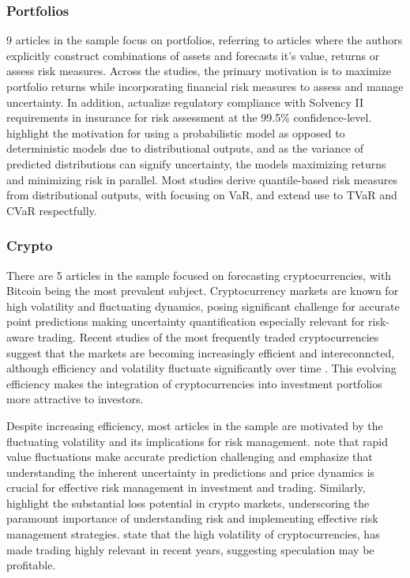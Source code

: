 \subsubsection{Portfolios}
9 articles in the sample focus on portfolios, referring to articles where the authors explicitly construct combinations of assets and forecasts it's value, returns or assess risk measures. Across the studies, the primary motivation is to maximize portfolio returns while incorporating financial risk measures to assess and manage uncertainty. In addition, \cite{Risk2018gpr} actualize regulatory compliance with Solvency II requirements in insurance for risk assessment at the 99.5\% confidence-level. \cite{kim2023portfolio} highlight the motivation for using a probabilistic model as opposed to deterministic models due to distributional outputs, and as the variance of predicted distributions can signify uncertainty, the models maximizing returns and minimizing risk in parallel. Most studies derive quantile-based risk measures from distributional outputs, with \cite{Fatouros2023DeepVaR, arian2022encoded, caprioli2023quantifying} focusing on VaR, and  \cite{Risk2018gpr, Min2023BlackLitterman} extend use to TVaR and CVaR respectfully. 

\subsubsection{Crypto}
There are 5 articles in the sample focused on forecasting cryptocurrencies, with Bitcoin being the most prevalent subject. Cryptocurrency markets are known for high volatility and fluctuating dynamics, posing significant challenge for accurate point predictions making uncertainty quantification especially relevant for risk-aware trading. Recent studies of the most frequently traded cryptocurrencies suggest that the markets are becoming increasingly efficient and intereconncted, although efficiency and volatility fluctuate significantly over time \parencite{noda2021evolution, liu2019volatility, gupta2022empirical}. This evolving efficiency makes the integration of cryptocurrencies into investment portfolios more attractive to investors.

Despite increasing efficiency, most articles in the sample are motivated by the fluctuating volatility and its implications for risk management. \cite{Golnari2024Cryptocurrency} note that rapid value fluctuations make accurate prediction challenging and emphasize that understanding the inherent uncertainty in predictions and price dynamics is crucial for effective risk management in investment and trading. Similarly, 
\cite{Almeida2024RiskForecasting} highlight the substantial loss potential in crypto markets, underscoring the paramount importance of understanding risk and implementing effective risk management strategies. \cite{cocco2021predictions} state that the high volatility of cryptocurrencies, has made trading highly relevant in recent years, suggesting speculation may be profitable. 


